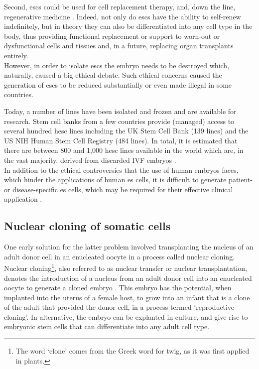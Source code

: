 Second, \glspl{esc} could be used for cell replacement therapy, and, down the line, regenerative medicine \cite{kimbrel2015current}.
Indeed, not only do \glspl{esc} have the ability to self-renew indefinitely, but in theory they can also be differentiated into any cell type in the body, thus providing functional replacement or support to worn-out or dysfunctional cells and tissues and, in a future, replacing organ transplants entirely. \\

However, in order to isolate \glspl{esc} the embryo needs to be destroyed which, naturally, caused a big ethical debate.
Such ethical concerns caused the generation of \glspl{esc} to be reduced substantially or even made illegal in some countries.

Today, a number of lines have been isolated and frozen and are available for research.
Stem cell banks from a few countries provide (managed) access to several hundred \gls{hesc} lines including the UK Stem Cell Bank (139 lines) and the US NIH Human Stem Cell Registry (484 lines).
In total, it is estimated that there are between 800 and 1,000 \gls{hesc} lines available in the world which are, in the vast majority, derived from discarded IVF embryos \cite{isasi2009governing}. \\

In addition to the ethical controversies that the use of human embryos faces, which hinder the applications of human \gls{es} cells, it is difficult to generate patient- or disease-specific \gls{es} cells, which may be required for their effective clinical application \cite{yamanaka2007strategies}.


\subsection{Nuclear cloning of somatic cells}
\label{sec:cloning} 
One early solution for the latter problem involved transplanting the nucleus of an adult donor cell in an enucleated oocyte in a process called nuclear cloning. \\

Nuclear cloning\footnote{The word `clone' comes from the Greek word for twig, as it was first applied in plants.}, also referred to as nuclear transfer or nuclear transplantation, denotes the introduction of a nucleus from an adult donor cell into an enucleated oocyte to generate a cloned embryo \cite{hochedlinger2003nuclear}.
This embryo has the potential, when implanted into the uterus of a female host, to grow into an infant that is a clone of the adult that provided the donor cell, in a process termed `reproductive cloning'. 
In alternative, the embryo can be explanted in culture, and give rise to embryonic stem cells that can differentiate into any adult cell type.\\

